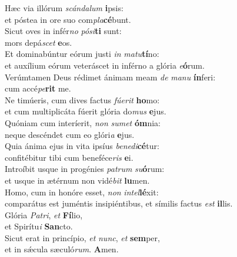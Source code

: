 \oddverse Hæc via illórum \textit{scán}\textit{da}\textit{lum} \textbf{i}psis:~\*\\
\oddverse et póstea in ore suo com\textit{pla}\textbf{cé}bunt.\\
\evenverse Sicut oves in infér\textit{no} \textit{pó}\textit{si}\textbf{ti} sunt:~\*\\
\evenverse mors depá\textit{scet} \textbf{e}os.\\
\oddverse Et dominabúntur eórum justi \textit{in} \textit{ma}\textit{tu}\textbf{tí}no:~\*\\
\oddverse et auxílium eórum veteráscet in inférno a glória \textit{e}\textbf{ó}rum.\\
\evenverse Verúmtamen Deus rédimet ánimam meam \textit{de} \textit{ma}\textit{nu} \textbf{ín}feri:~\*\\
\evenverse cum accé\textit{pe}\textbf{rit} me.\\
\oddverse Ne timúeris, cum dives factus \textit{fú}\textit{e}\textit{rit} \textbf{ho}mo:~\*\\
\oddverse et cum multiplicáta fúerit glória do\textit{mus} \textbf{e}jus.\\
\evenverse Quóniam cum interíerit, \textit{non} \textit{su}\textit{met} \textbf{óm}nia:~\*\\
\evenverse neque descéndet cum eo glóri\textit{a} \textbf{e}jus.\\
\oddverse Quia ánima ejus in vita ipsíus \textit{be}\textit{ne}\textit{di}\textbf{cé}tur:~\*\\
\oddverse confitébitur tibi cum beneféce\textit{ris} \textbf{e}i.\\
\evenverse Introíbit usque in progénies \textit{pa}\textit{trum} \textit{su}\textbf{ó}rum:~\*\\
\evenverse et usque in ætérnum non vidé\textit{bit} \textbf{lu}men.\\
\oddverse Homo, cum in honóre esset, \textit{non} \textit{in}\textit{tel}\textbf{lé}xit:~\*\\
\oddverse comparátus est juméntis insipiéntibus, et símilis factus \textit{est} \textbf{il}lis.\\
\evenverse Glória \textit{Pa}\textit{tri}, \textit{et} \textbf{Fí}lio,~\*\\
\evenverse et Spirítu\textit{i} \textbf{San}cto.\\
\oddverse Sicut erat in princípio, \textit{et} \textit{nunc}, \textit{et} \textbf{sem}per,~\*\\
\oddverse et in sǽcula sæculó\textit{rum}. \textbf{A}men.\\
